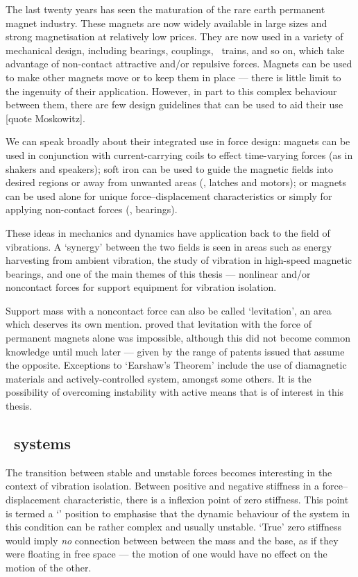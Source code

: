 The last twenty years has seen the maturation of the rare earth permanent magnet industry. These magnets are now widely available in large sizes and strong magnetisation at relatively low prices. They are now used in a variety of mechanical design, including bearings, couplings, \maglev\ trains, and so on, which take advantage of non-contact attractive and/or repulsive forces.
Magnets can be used to make other magnets move or to keep them in place — there is little limit to the ingenuity of their application. However, in part to this complex behaviour between them, there are few design guidelines that can be used to aid their use [quote Moskowitz].

We can speak broadly about their integrated use in force design: magnets can be used in conjunction with current-carrying coils to effect time-varying forces (as in shakers and speakers); soft iron can be used to guide the magnetic fields into desired regions or away from unwanted areas (\eg, latches and motors); or magnets can be used alone for unique force--displacement characteristics or simply for applying non-contact forces (\eg, bearings).

These ideas in mechanics and dynamics have application back to the field of vibrations. A `synergy' between the two fields is seen in areas such as energy harvesting from ambient vibration, the study of vibration in high-speed magnetic bearings, and one of the main themes of this thesis — nonlinear and/or noncontact forces for support equipment for vibration isolation.

Support mass with a noncontact force can also be called `levitation', an area which deserves its own mention. \textcite{earnshaw1842} proved that levitation with the force of permanent magnets alone was impossible, although this did not become common knowledge
until much later — given by the range of patents issued that assume the opposite. Exceptions to `Earshaw's Theorem' include the use of diamagnetic materials and actively-controlled system, amongst some others. It is the possibility of overcoming instability with active means that is of interest in this thesis.

\subsection{\QZS\ systems}

The transition between stable and unstable forces becomes interesting in the context of vibration isolation. Between positive and negative stiffness in a force--displacement characteristic, there is a inflexion point of zero stiffness. This point is termed a `\qzs' position to emphasise that the dynamic behaviour of the system in this condition can be rather complex and usually unstable. `True' zero stiffness would imply \emph{no} connection between between the mass and the base, as if they were floating in free space — the motion of one would have no effect on the motion of the other.

